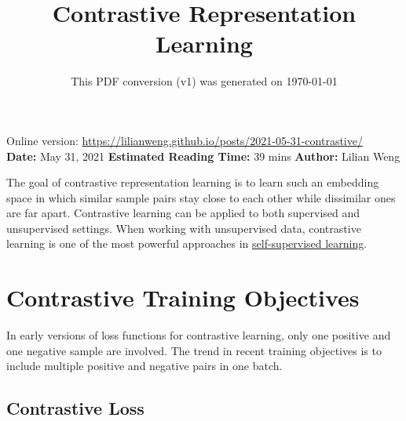 \documentclass[12pt]{article}
\title{Contrastive Representation Learning}
\date{This PDF conversion (v1) was generated on \today\footnotemark}
\begin{document}
\maketitle
\begin{center}
    Online version: \url{https://lilianweng.github.io/posts/2021-05-31-contrastive/} \\
    \textbf{Date:} May 31, 2021 \quad
    \textbf{Estimated Reading Time:}  39 mins \quad
    \textbf{Author:} Lilian Weng
\end{center}

The goal of contrastive representation learning is to learn such an embedding space in which similar sample pairs stay close to each other while dissimilar ones are far apart. Contrastive learning can be applied to both supervised and unsupervised settings. When working with unsupervised data, contrastive learning is one of the most powerful approaches in \href{https://lilianweng.github.io/posts/2019-11-10-self-supervised/}{self-supervised learning}.


\newpage
\tableofcontents
\newpage
\vspace{1em}




\section{Contrastive Training Objectives}

In early versions of loss functions for contrastive learning, only one positive and one negative sample are involved. The trend in recent training objectives is to include multiple positive and negative pairs in one batch.

\subsection{Contrastive Loss}
\end{document}

